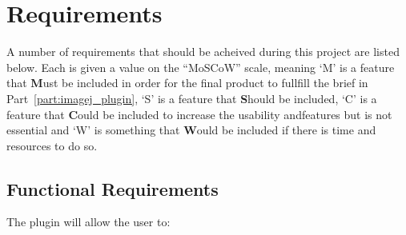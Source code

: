 
\onecolumn
\section{Requirements}
\label{sec:requirements}

A number of requirements that should be acheived during this project are listed
below. Each is given a value on the ``MoSCoW'' scale, meaning `M' is a feature
that \textbf{M}ust be included in order for the final product to fullfill the
brief in Part~\ref{part:imagej_plugin}, `S' is a feature that \textbf{S}hould
be included, `C' is a feature that \textbf{C}ould be included to increase the
usability andfeatures but is not essential and `W' is something that
\textbf{W}ould be included if there is time and resources to do so.

\subsection{Functional Requirements}
\label{sub:functional_requirements}

The plugin will allow the user to:

